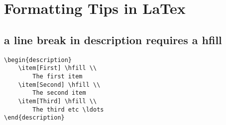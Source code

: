 \section{Formatting Tips in LaTex}
\subsection{a line break in description requires a hfill}
\begin{verbatim}
\begin{description}
    \item[First] \hfill \\
        The first item
    \item[Second] \hfill \\
        The second item
    \item[Third] \hfill \\
        The third etc \ldots
\end{description}
\end{verbatim}

